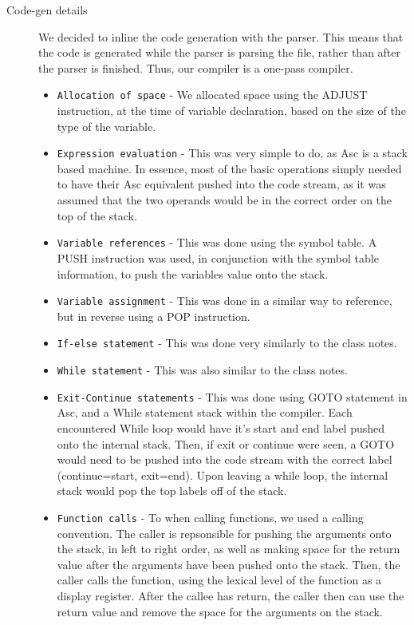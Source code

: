 \documentclass{article}
\begin{document}
\begin{description}
\item[Code-gen details]
	We decided to inline the code generation with the parser. This means that the code is generated while the parser is parsing the file, rather than 
	after the parser is finished. Thus, our compiler is a one-pass compiler.
	\begin{itemize}
		\item
			\texttt{Allocation of space} - We allocated space using the ADJUST instruction, at the time of variable declaration, based on
				the size of the type of the variable.
		\item
			\texttt{Expression evaluation} - This was very simple to do, as Asc is a stack based machine. In essence, most of the basic operations
				simply needed to have their Asc equivalent pushed into the code stream, as it was assumed that the two operands would be in
				the correct order on the top of the stack.
		\item
			\texttt{Variable references} - This was done using the symbol table. A PUSH instruction was used, in conjunction with the symbol table 
				information, to push the variables value onto the stack.
		\item
			\texttt{Variable assignment} - This was done in a similar way to reference, but in reverse using a POP instruction.
		\item
			\texttt{If-else statement} - This was done very similarly to the class notes.
		\item
			\texttt{While statement} - This was also similar to the class notes.
		\item
			\texttt{Exit-Continue statements} - This was done using GOTO statement in Asc, and a While statement stack within the compiler. 
				Each encountered While loop would have it's start and end label pushed onto the internal stack. Then, if exit or continue
				were seen, a GOTO would need to be pushed into the code stream with the correct label (continue=start, exit=end). Upon leaving
				a while loop, the internal stack would pop the top labels off of the stack.
		\item
			\texttt{Function calls} - To when calling functions, we used a calling convention. The caller is repsonsible for pushing the arguments onto
				the stack, in left to right order, as well as making space for the return value after the arguments have been pushed onto the stack.
				Then, the caller calls the function, using the lexical level of the function as a display register. After the callee has return, the 
				caller then can use the return value and remove the space for the arguments on the stack.
	\end{itemize}			


\end{description}
\end{document}
